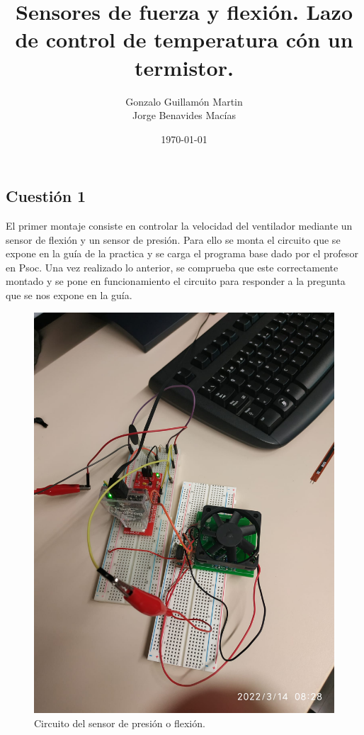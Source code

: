 \documentclass[11pt,a4paper]{article}
\begin{document}
\subject{Instrumentación de electrónica}
\title{Sensores de fuerza y flexión. Lazo de control de temperatura cón un termistor.}
\subtitle{}
\author{Gonzalo Guillamón Martin \\ Jorge Benavides Macías}
\date{\today}

\portada

\subsection*{Cuestión 1}

El primer montaje consiste en controlar la velocidad del ventilador mediante un sensor de flexión y un sensor de presión. Para ello se monta el circuito que se expone en la guía de la practica y se carga el programa base dado por el profesor en Psoc. Una vez realizado lo anterior, se comprueba que este correctamente montado y se pone en funcionamiento el circuito para responder a la pregunta que se nos expone en la guía.

\begin{figure}[h]
    \centering
    \includegraphics[scale = 0.15]{images/IE_practica_3_sensor_presion.jpeg}
    \caption{Circuito del sensor de presión o flexión.}
    \label{a}
\end{figure}
\end{document}
